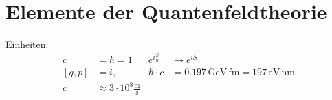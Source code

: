\documentclass[ngerman, paper=a4, 12pt]{scrartcl}
\begin{document}
	\section{Elemente der Quantenfeldtheorie} 
	Einheiten:
		\begin{align*}
			 c &= \hbar = 1 & e^{i \frac{S}{\hbar}} &\mapsto e^{iS} \\
			 [q, p] &= i ,&
			 \hbar \cdot c &= 0.197 \mathrm{\,GeV\,fm} = 197 \mathrm{\,eV\,nm} \\
			 c &\approx 3 \cdot 10^8 \frac{\mathrm{m}}{\mathrm{s}}
		\end{align*}
	
	
	
	
	
	
	
\end{document}
